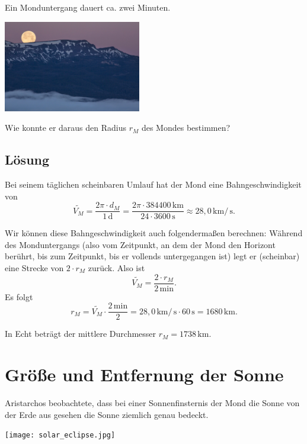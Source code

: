 \documentclass{scrartcl}
\newcommand{\RM}{r_M} %
\newcommand{\DM}{d_M} %
\newcommand{\VM}{V_M} %
\newcommand{\km}{\,\mathrm{km}} %
\newcommand{\minu}{\,\mathrm{min}} %
\newcommand{\seco}{\,\mathrm{s}} %
\newcommand{\days}{\,\mathrm{d}} %
\begin{document}
  Ein Monduntergang dauert ca. zwei Minuten.

  \begin{center}
    \includegraphics[width=6cm]{monduntergang.jpg}
  \end{center}

  Wie konnte er daraus den Radius $\RM$ des Mondes bestimmen?

  \newpage
  \newpage
  \subsection{Lösung}

  Bei seinem täglichen scheinbaren Umlauf hat der Mond eine Bahngeschwindigkeit von
  \[ \tilde{\VM} = \frac{2\pi \cdot \DM}{1 \days} = \frac{2\pi \cdot 384400 \km}{24 \cdot 3600 \seco} \approx 28,0 \km / \seco. \]

  Wir können diese Bahngeschwindigkeit auch folgendermaßen berechnen: Während des Monduntergangs (also vom Zeitpunkt, an dem der Mond den Horizont berührt, bis zum Zeitpunkt, bis er vollends untergegangen ist) legt er (scheinbar) eine Strecke von $2 \cdot \RM$ zurück. Also ist
  \[ \tilde{\VM} = \frac{2 \cdot \RM}{2 \minu}. \]
  Es folgt
  \[ \RM = \tilde{\VM} \cdot \frac{2 \minu}{2} = 28,0 \km / \seco \cdot 60 \seco = 1680 \km. \]

  In Echt beträgt der mittlere Durchmesser $\RM = 1738 \km$.

  \newpage
  \section{Größe und Entfernung der Sonne}

  Aristarchos beobachtete, dass bei einer Sonnenfinsternis der Mond die Sonne von der Erde aus gesehen die Sonne ziemlich genau bedeckt.

  \begin{center}
    \texttt{[image: solar\_eclipse.jpg]}
  \end{center}

  \vspace{4cm}
\end{document}
